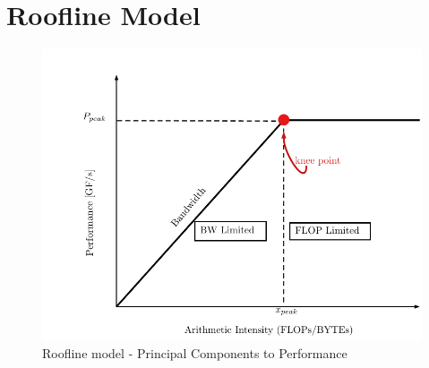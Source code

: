 \documentclass{article}
\begin{document}
\section{Roofline Model}
\begin{figure}[!htp]
    \centering
    \includegraphics[width=.4\textwidth, height=.3\textwidth]{Roofline_0_2.pdf}
    \caption{Roofline model - Principal Components to Performance}
    \label{Roofline_4}
\end{figure}
\end{document}
